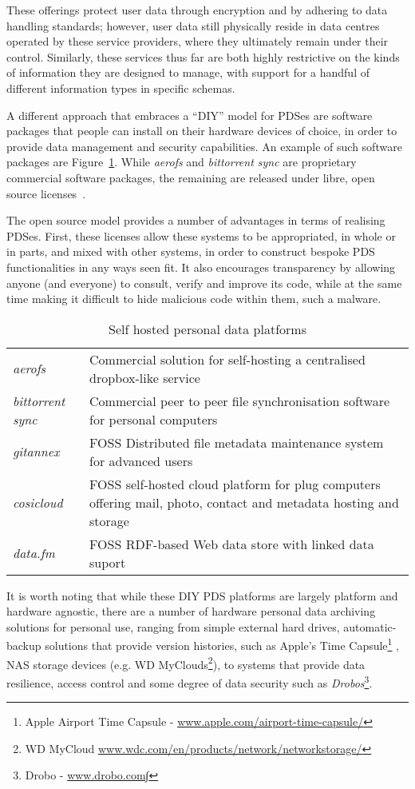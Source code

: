 \documentclass[graybox]{svmult}
\begin{document}
These offerings protect user data through encryption and by adhering to data handling standards; however, user data still physically reside in data centres operated by these service providers, where they ultimately remain under their control.  Similarly, these services thus far are both highly restrictive on the kinds of information they are designed to manage, with support for a handful of different information types in specific schemas.

A different approach that embraces a ``DIY” model \cite{diy-culture} for PDSes are software packages that people can install on their hardware devices of choice, in order to provide data management and security capabilities.  An example of such software packages are Figure~\ref{fig:selfhosted}.   While \emph{aerofs} and \emph{bittorrent sync} are proprietary commercial software packages, the remaining are released under libre, open source licenses~\cite{foss}. 

The open source model provides a number of advantages in terms of realising PDSes.  First, these licenses allow these systems to be appropriated,  in whole or in parts, and mixed with other systems, in order to construct bespoke PDS functionalities in any ways seen fit.  It also encourages transparency by allowing anyone (and everyone) to consult, verify and improve its code, while at the same time making it difficult to hide malicious code within them, such a malware.  

\begin{table}
\begin{tabular}{l p{9cm}}
\emph{aerofs} & Commercial solution for self-hosting a centralised dropbox-like service \\
\emph{bittorrent sync} & Commercial peer to peer file synchronisation software for personal computers \\
\emph{gitannex} &  FOSS Distributed file metadata maintenance system for advanced users \\ 
\emph{cosicloud} & FOSS self-hosted cloud platform for plug computers offering mail, photo, contact and metadata hosting and storage \\
\emph{data.fm} & FOSS RDF-based Web data store with linked data suport
\end{tabular}
\caption{Self hosted personal data platforms}
\label{fig:selfhosted}
\end{table}

It is worth noting that while these DIY PDS platforms are largely platform and hardware agnostic, there are a number of hardware personal data archiving solutions for personal use, ranging from simple external hard drives, automatic-backup solutions that provide version histories, such as Apple’s Time Capsule\footnote{Apple Airport Time Capsule - \url{www.apple.com/airport-time-capsule/}} , NAS storage devices (e.g. WD MyClouds\footnote{WD MyCloud \url{www.wdc.com/en/products/network/networkstorage/}}), to systems that provide data resilience, access control and some degree of data security such as  \emph{Drobos}\footnote{Drobo - \url{www.drobo.com∫}}.  
\end{document}
